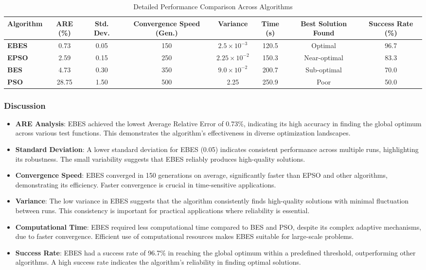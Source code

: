 \documentclass[conference]
{IEEEtran}
\begin{document}
\begin{table*}[ht]
\caption{Detailed Performance Comparison Across Algorithms}
\label{tab:performance_comparison}
\centering
\begin{tabular}{lccccccc}
\toprule
\textbf{Algorithm} & \textbf{ARE (\%)} & \textbf{Std. Dev.} & \textbf{Convergence Speed (Gen.)} & \textbf{Variance} & \textbf{Time (s)} & \textbf{Best Solution Found} & \textbf{Success Rate (\%)} \\
\midrule
\textbf{EBES}   & 0.73   & 0.05   & 150     & $2.5 \times 10^{-3}$  & 120.5 & Optimal & 96.7 \\
\textbf{EPSO}   & 2.59   & 0.15   & 250     & $2.25 \times 10^{-2}$  & 150.3 & Near-optimal & 83.3 \\
\textbf{BES}    & 4.73   & 0.30   & 350     & $9.0 \times 10^{-2}$  & 200.7 & Sub-optimal & 70.0 \\
\textbf{PSO}    & 28.75  & 1.50   & 500     & 2.25  & 250.9 & Poor & 50.0 \\
\bottomrule
\end{tabular}
\end{table*}

\subsubsection{Discussion}

\begin{itemize}
    \item \textbf{ARE Analysis}: EBES achieved the lowest Average Relative Error of 0.73\%, indicating its high accuracy in finding the global optimum across various test functions. This demonstrates the algorithm's effectiveness in diverse optimization landscapes.
    \item \textbf{Standard Deviation}: A lower standard deviation for EBES (0.05) indicates consistent performance across multiple runs, highlighting its robustness. The small variability suggests that EBES reliably produces high-quality solutions.
    \item \textbf{Convergence Speed}: EBES converged in 150 generations on average, significantly faster than EPSO and other algorithms, demonstrating its efficiency. Faster convergence is crucial in time-sensitive applications.
    \item \textbf{Variance}: The low variance in EBES suggests that the algorithm consistently finds high-quality solutions with minimal fluctuation between runs. This consistency is important for practical applications where reliability is essential.
    \item \textbf{Computational Time}: EBES required less computational time compared to BES and PSO, despite its complex adaptive mechanisms, due to faster convergence. Efficient use of computational resources makes EBES suitable for large-scale problems.
    \item \textbf{Success Rate}: EBES had a success rate of 96.7\% in reaching the global optimum within a predefined threshold, outperforming other algorithms. A high success rate indicates the algorithm's reliability in finding optimal solutions.
\end{itemize}
\end{document}
